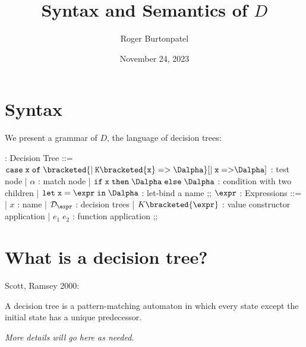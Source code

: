 \documentclass{article}
\title{Syntax and Semantics of $D$}
\author{Roger Burtonpatel}
\date{November 24, 2023}
\begin{document}
\maketitle

\section{Syntax}

We present a grammar of $D$, the language of decision trees: 


\begin{center}
  \begin{bnf}
    \Dalpha : \textsf{Decision Tree} ::= 
    $\tt{case}\; x\; \tt{of}\; 
    \bracketed{\vert\; K\bracketed{x}\; \tt{=>}\; \Dalpha}
    [\vert\; x\; \tt{=>} \Dalpha]$ : test node 
    | $\alpha$ : match node 
    | $\tt{if}\; x\; \tt{then}\; \Dalpha\; \tt{else}\; \Dalpha$ : condition with two children 
    | $\tt{let}\; x\; \tt{=}\; \expr\; \tt{in}\; \Dalpha$ : let-bind a name
    ;;
    $\expr$ : \textsf{Expressions} ::=
    | $x$ : name
    | $\mathcal{D}_{\expr}$ : decision trees 
    | $K \bracketed{\expr}$ : value constructor application 
    | $e_1\; e_2$ : function application 
    ;;
  \end{bnf}
\end{center}

\section{What is a decision tree?}
Scott, Ramsey 2000: 

A decision tree is a pattern-matching automaton in which every state except the
initial state has a unique predecessor. 

\bigskip

\it{More details will go here as needed.}


\end{document}
